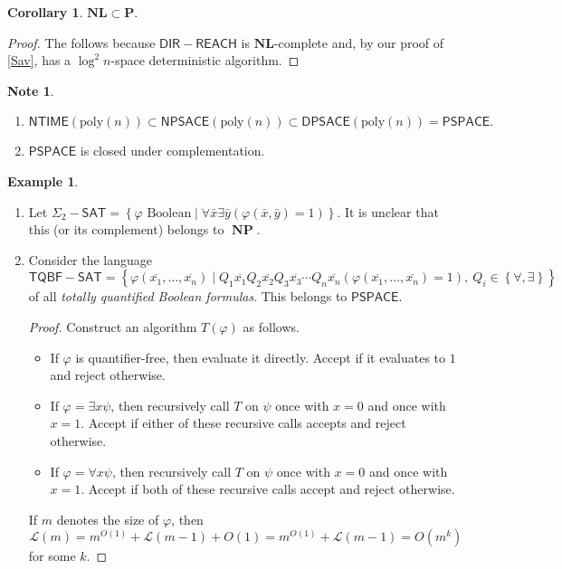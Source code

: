 \documentclass[10pt,letterpaper,cm]{nupset}
\theoremstyle{definition}
\newtheorem{exmp}[definition]{Example}
\newtheorem{note}[definition]{Note}
\theoremstyle{theorem}
\newtheorem{corollary}[definition]{Corollary}
\theoremstyle{remark}
\newcommand{\1}{\mathbf{1}}
\newcommand{\0}{\vec 0}
\DeclareMathOperator{\NP}{\mathbf{NP}}
\begin{document}
\begin{corollary}
$\mathbf{NL} \subset \mathbf{P}$.
\end{corollary}
\begin{proof}
The follows because $\mathsf{DIR{-}REACH}$ is  $\mathbf{NL}$-complete and, by our proof of \cref{Sav}, has a $\log^2{n}$-space deterministic algorithm.
\end{proof}

\begin{note} $ $
\begin{enumerate}
\item $\mathsf{NTIME}(\text{poly}(n)) \subset \mathsf{NPSACE}(\text{poly}(n)) \subset \mathsf{DPSACE}(\text{poly}(n)) = \mathsf{PSPACE}.$
\item $\mathsf{PSPACE}$ is closed under complementation. 
\end{enumerate}
\end{note}

\begin{exmp} $ $
\begin{enumerate}
\item Let $\Sigma_2{-}\mathsf{SAT} = \left\{\varphi \text{ Boolean} \mid \forall \bar{x} \exists \bar{y}(\varphi(\bar{x}, \bar{y}) = 1)\right\}$. It is unclear that this (or its complement) belongs to $\NP$. 
\item Consider the language $$\mathsf{TQBF{-}SAT} = \left\{ \varphi\left(\overline{x_1}, \ldots, \overline{x_n}\right) \mid Q_1 \overline{x_1} Q_2 \overline{x_2}Q_3 \overline{x_3} \cdots Q_n \overline{x_n} \left(\varphi\left(\overline{x_1}, \ldots, \overline{x_n}\right) = 1\right), \ Q_i \in \left\{\forall, \exists\right\} \right\}$$  of all \textit{totally quantified Boolean formulas}. This belongs to $\mathsf{PSPACE}$.
\begin{proof}
Construct an algorithm $T(\varphi)$ as follows. 
\begin{itemize}
\item If $\varphi$ is quantifier-free, then evaluate it directly. Accept if it evaluates to $1$ and reject otherwise. 
\item If $\varphi = \exists x \psi$, then recursively call $T$ on $\psi$ once with $x=0$ and once with $x=1$. Accept if either of these recursive calls accepts and reject otherwise. 
\item If  $\varphi = \forall x \psi$, then recursively call $T$ on $\psi$ once with $x=0$ and once with $x=1$. Accept if both of these recursive calls accept and reject otherwise. 
\end{itemize} 
If $m$ denotes the size of $\varphi$, then $$\mathcal{L}(m) = m^{O(1)} + \mathcal{L}(m-1) + O(1) = m^{O(1)} + \mathcal{L}(m-1) = O\left(m^k\right)$$ for some $k$.
\end{proof}
\end{enumerate}
\end{exmp}
\end{document}
